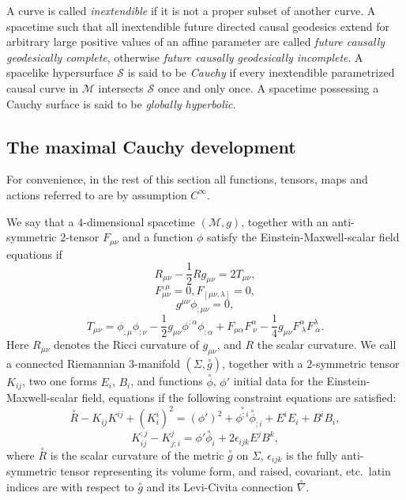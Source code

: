 \documentclass{article}
\begin{document}
A curve is called \emph{inextendible} if it is not a proper subset of
another curve. A spacetime such that all inextendible future directed
causal geodesics
extend for arbitrary large positive values of an affine parameter
are called \emph{future causally geodesically complete}, otherwise 
\emph{future causally geodesically incomplete}.
A spacelike hypersurface $\mathcal{S}$
is said to be \emph{Cauchy}
if every inextendible parametrized
causal curve in $\mathcal{M}$ intersects $\mathcal{S}$ once and only once.
A spacetime possessing a Cauchy surface is said to be
\emph{globally hyperbolic}. 

\subsection{The maximal Cauchy development}
\label{cccon}
For convenience, in the rest of this section
all functions, tensors, maps and actions referred
to are by assumption $C^\infty$.

We say that a $4$-dimensional spacetime $(\mathcal{M}, g)$,
together with an anti-symmetric $2$-tensor $F_{\mu\nu}$
and a function $\phi$ satisfy the Einstein-Maxwell-scalar
field equations if
\[
R_{\mu\nu}-\frac12Rg_{\mu\nu}=2T_{\mu\nu},
\]
\[
F^{,\mu}_{\mu\nu}=0, F_{[\mu\nu,\lambda]}=0,
\]
\[
g^{\mu\nu}\phi_{;\mu\nu}=0,
\]
\[
T_{\mu\nu}=\phi_{;\mu}\phi_{;\nu}
-\frac12g_{\mu\nu}\phi^{;\alpha}\phi_{;\alpha}
+F_{\mu\alpha}F^{\alpha}_{\ \nu}-\frac14g_{\mu\nu}F^{\alpha}_{\ \lambda}
F^{\lambda}_{\ \alpha}.
\]
Here $R_{\mu\nu}$ denotes the Ricci curvature of $g_{\mu\nu}$, and
$R$ the scalar curvature. 
We call a connected
Riemannian $3$-manifold $(\Sigma, \stackrel\circ{g})$, together
with a $2$-symmetric tensor $K_{ij}$, two one forms $E_i$, $B_i$, 
and functions $\stackrel{\circ}\phi$,
$\phi'$ initial data for the Einstein-Maxwell-scalar field,
equations if the following constraint equations are satisfied:
\[
\stackrel\circ{R} - K_{ij} K^{ij} + (K^i_i)^2 = (\phi')^2 + 
\stackrel\circ{{\phi}^{;i}}\stackrel\circ{\phi}_{;i} + 
E^iE_i  + 
B^iB_i,
\]
\[
K_{ij}^{;j} - K^j_{j;i} = \phi'\stackrel\circ{\phi}_i+
2\epsilon_{ijk}  E^j B^k, 
\]
where $\stackrel\circ{ R}$ is the scalar curvature of the metric 
$\stackrel\circ{g}$ on $\Sigma$, $\epsilon_{ijk}$ is the fully anti-symmetric tensor 
representing its volume form, and raised, covariant, etc.~latin indices are with respect
to $\stackrel\circ{g}$ and its Levi-Civita connection $\stackrel\circ\nabla$.
\end{document}

